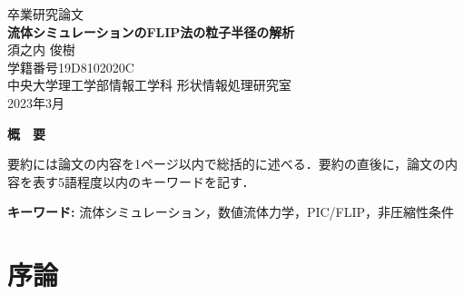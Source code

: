 \documentclass[a4j,12pt]{jreport}
\begin{document}
\thispagestyle{empty}
\begin{center}
\begin{Large}
\vspace*{0.7cm}
{\large 卒業研究論文}\\
\vspace*{2.5cm}
{\bf 流体シミュレーションのFLIP法の粒子半径の解析}\\
\vspace*{7.5cm}
須之内 俊樹\\
学籍番号\hspace*{1zw}19D8102020C\\
\vspace*{2.5cm}
中央大学理工学部情報工学科\hspace*{1zw} 形状情報処理研究室\\
\vspace*{3.0cm}
2023年3月\\
\end{Large}
\end{center}


\newpage
\renewcommand{\baselinestretch}{1.25} \selectfont
{}


\begin{center} {\large \bf{概　要}} \end{center}

要約には論文の内容を1ページ以内で総括的に述べる．要約の直後に，論文の内容を表す5語程度以内のキーワードを記す．


\vspace{1zw} \noindent
{\bf キーワード: }流体シミュレーション，数値流体力学，PIC/FLIP，非圧縮性条件

\tableofcontents


\newpage
{}



\chapter{序論} \label{chapter:2}
\end{document}
